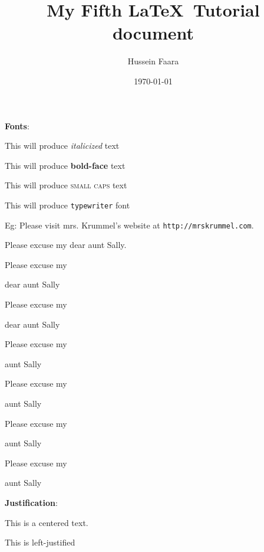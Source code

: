 \documentclass[11pt]{article}
\begin{document}
\tableofcontents

\title{My Fifth \LaTeX \ Tutorial document}
\author{Hussein Faara}
\date{\today}
\maketitle

\begin{center}\textbf{Fonts}:\end{center}

\begin{center}
This will produce \textit{italicized} text

This will produce \textbf{bold-face} text

This will produce \textsc{small caps} text

This will produce \texttt{typewriter} font

Eg:
Please  visit mrs. Krummel's website at \texttt{http://mrskrummel.com}.

Please excuse my dear aunt Sally.

Please excuse my \begin{large}dear aunt Sally \end{large}

Please excuse my \begin{Large}dear aunt Sally \end{Large}

Please excuse my \begin{huge}
aunt Sally \end{huge}

Please excuse my \begin{Huge}
aunt Sally \end{Huge}

Please excuse my \begin{small}
aunt Sally \end{small}

Please excuse my \begin{tiny}
aunt Sally \end{tiny}

\end{center}

\begin{center}\textbf{Justification}:\end{center}

\begin{center}
This is a centered text.
\end{center}

\begin{flushleft}
This is left-justified
\end{flushleft}
\end{document}
